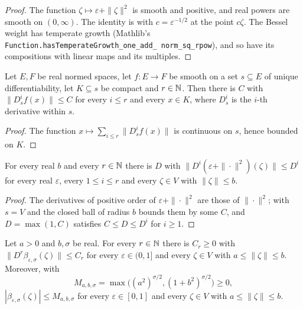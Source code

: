 \begin{proof}
\leanok
The function $\zeta \mapsto \varepsilon + \|\zeta\|^2$ is smooth and positive, and real powers
are smooth on $(0, \infty)$. The identity is  with
$c = \varepsilon^{-1/2}$ at the point $c \zeta$. The Bessel weight
has temperate growth (Mathlib's
\texttt{Function.\allowbreak hasTemperateGrowth\_\allowbreak one\_\allowbreak add\_\allowbreak
norm\_\allowbreak sq\_\allowbreak rpow}), and so have its compositions with linear maps and its
multiples.
\end{proof}

\begin{lemma}
\label{lem:bounded-derivatives-compact}
\leanok
Let $E, F$ be real normed spaces, let $f \colon E \to F$ be smooth on a set $s \subseteq E$ of
unique differentiability, let $K \subseteq s$ be compact and $r \in \mathbb{N}$. Then there is $C$ with
$\|D^i_s f(x)\| \leq C$ for every $i \leq r$ and every $x \in K$, where $D^i_s$ is the $i$-th
derivative within $s$.
\end{lemma}

\begin{proof}
\leanok
The function $x \mapsto \sum_{i \leq r} \|D^i_s f(x)\|$ is continuous on $s$, hence bounded on
$K$.
\end{proof}

\begin{lemma}
\label{lem:norm-sq-derivatives}
\leanok
{}
For every real $b$ and every $r \in \mathbb{N}$ there is $D$ with
$\|D^i (\varepsilon + \|\cdot\|^2)(\zeta)\| \leq D^i$ for every real $\varepsilon$, every
$1 \leq i \leq r$ and every $\zeta \in V$ with $\|\zeta\| \leq b$.
\end{lemma}

\begin{proof}
\leanok
The derivatives of positive order of $\varepsilon + \|\cdot\|^2$ are those of $\|\cdot\|^2$;
 with $s = V$ and the closed ball of radius $b$ bounds them
by some $C$, and $D = \max(1, C)$ satisfies $C \leq D \leq D^i$ for $i \geq 1$.
\end{proof}

\begin{lemma}
\label{lem:shifted-bessel-symbol-bounds}
\leanok
{}
Let $a > 0$ and $b, \sigma$ be real. For every $r \in \mathbb{N}$ there is $C_r \geq 0$ with
$\|D^r \beta_{\varepsilon,\sigma}(\zeta)\| \leq C_r$ for every $\varepsilon \in (0, 1]$ and every
$\zeta \in V$ with $a \leq \|\zeta\| \leq b$. Moreover, with
\[
  M_{a,b,\sigma} = \max \bigl( (a^2)^{\sigma/2}, (1 + b^2)^{\sigma/2} \bigr) \geq 0 ,
\]
$|\beta_{\varepsilon,\sigma}(\zeta)| \leq M_{a,b,\sigma}$ for every $\varepsilon \in [0, 1]$ and
every $\zeta \in V$ with $a \leq \|\zeta\| \leq b$.
\end{lemma}


